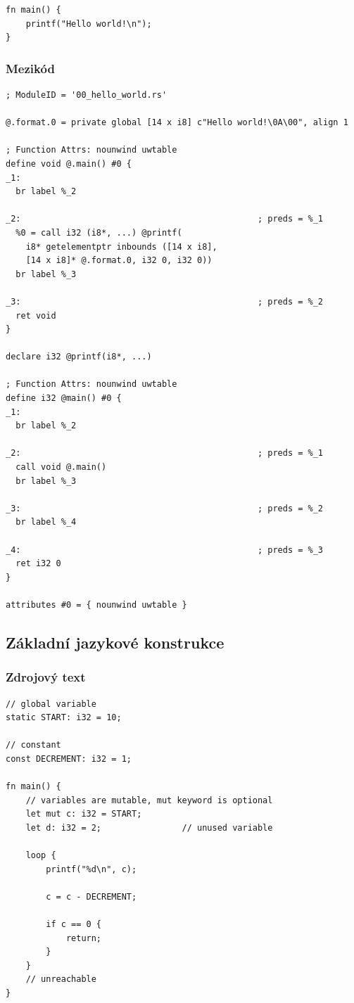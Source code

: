 \documentclass[12pt,a4paper]{article}
\begin{document}
\begin{verbatim}
fn main() {
    printf("Hello world!\n");
}
\end{verbatim}

\subsubsection{Mezikód}

\begin{verbatim}
; ModuleID = '00_hello_world.rs'

@.format.0 = private global [14 x i8] c"Hello world!\0A\00", align 1

; Function Attrs: nounwind uwtable
define void @.main() #0 {
_1:
  br label %_2

_2:                                               ; preds = %_1
  %0 = call i32 (i8*, ...) @printf(
    i8* getelementptr inbounds ([14 x i8], 
    [14 x i8]* @.format.0, i32 0, i32 0))
  br label %_3

_3:                                               ; preds = %_2
  ret void
}

declare i32 @printf(i8*, ...)

; Function Attrs: nounwind uwtable
define i32 @main() #0 {
_1:
  br label %_2

_2:                                               ; preds = %_1
  call void @.main()
  br label %_3

_3:                                               ; preds = %_2
  br label %_4

_4:                                               ; preds = %_3
  ret i32 0
}

attributes #0 = { nounwind uwtable }
\end{verbatim}

\subsection{Základní jazykové konstrukce}

\subsubsection{Zdrojový text}

\begin{verbatim}
// global variable
static START: i32 = 10;

// constant
const DECREMENT: i32 = 1;

fn main() {
    // variables are mutable, mut keyword is optional
    let mut c: i32 = START;
    let d: i32 = 2;                // unused variable

    loop {
        printf("%d\n", c);

        c = c - DECREMENT;

        if c == 0 {
            return;
        }
    }
    // unreachable
}
\end{verbatim}
\end{document}
